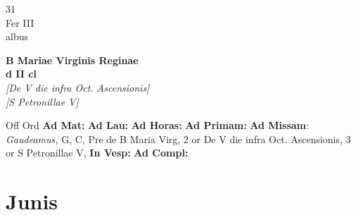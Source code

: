 \documentclass[10pt, openany]{book}
\begin{document}
    \begin{center}
        \begin{minipage}{3.5in}
            \vspace{2em}
            \begin{minipage}{0.5in}
                {\Huge 31} \\
                {\normalsize Fer III} \\
                {\normalsize albus}
            \end{minipage}
            \begin{minipage}{3.0in}
                \textbf{ \large B Mariae Virginis Reginae \\
                \textnormal{\normalsize d II cl}} \\ \textit{[De V die infra Oct. Ascensionis]} \\ \textit{[S Petronillae V]} \\ 
            \end{minipage}
            \begin{justify}Off Ord
                \textbf{Ad Mat: }
                \textbf{Ad Lau: }
                \textbf{Ad Horas: }
                \textbf{Ad Primam: }\textbf{Ad Missam}: \textit{Gaudeamus,} G, C, Pre de B Maria Virg, 2 or De V die infra Oct. Ascensionis, 3 or S Petronillae V,  
                \textbf{In Vesp: }
                \textbf{Ad Compl: }
            \end{justify}
        \end{minipage}
    \end{center}

    \chapter{Junis}
                    
\end{document}
